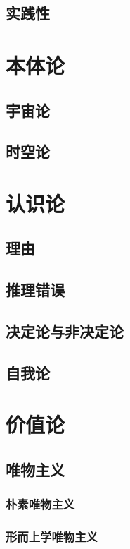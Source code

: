 \documentclass[UTF8]{../RepresentationUniverse}
\begin{document}
    \subsection{实践性}


\section{本体论}
    \subsection{宇宙论}
    \subsection{时空论}


\section{认识论}

    \subsection{理由}
    \subsection{推理错误}

    \subsection{决定论与非决定论}
    \subsection{自我论}


\section{价值论}
    \subsection{唯物主义}
        \subsubsection{朴素唯物主义}
        \subsubsection{形而上学唯物主义}
\end{document}
